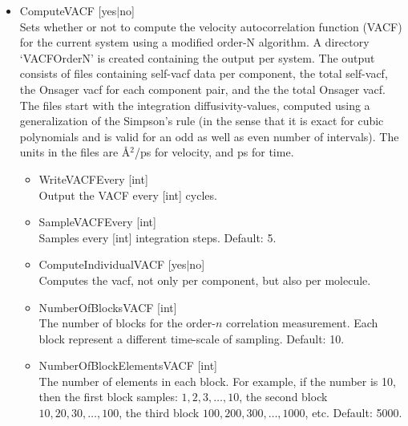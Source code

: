 \begin{itemize}
\item{ComputeVACF [yes$|$no]}\\
Sets whether or not to compute the velocity autocorrelation function (VACF) for the current system using a modified order-N algorithm.
A directory `VACFOrderN' is created containing the output per system. The output consists of files containing self-vacf data per
component, the total self-vacf, the Onsager vacf for each component pair, and the the total Onsager vacf.
The files start with the integration diffusivity-values, computed using a generalization of the Simpson's rule 
(in the sense that it is exact for cubic polynomials and is valid for an odd as well as even number of intervals).
The units in the files are \AA$^2$/ps for velocity, and ps for time.
  \begin{itemize}
    \item{WriteVACFEvery [int]}\\
     Output the VACF every [int] cycles.
    \item{SampleVACFEvery [int]}\\
    Samples every [int] integration steps. Default: 5.
    \item{ComputeIndividualVACF [yes$|$no]}\\
    Computes the vacf, not only per component, but also per molecule.
    \item{NumberOfBlocksVACF [int]}\\
    The  number of blocks for the order-$n$ correlation measurement. Each block represent a different time-scale of sampling. Default: 10.
    \item{NumberOfBlockElementsVACF [int]}\\
    The number of elements in each block. For example, if the number is 10, then the first block samples: $1,2,3,\dots,10$, the second block
    $10,20,30,\dots,100$, the third block $100,200,300,\dots,1000$, etc. Default: 5000.
   \end{itemize}


\end{itemize}

